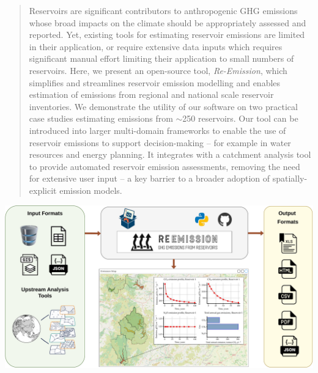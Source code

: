 \documentclass[final,1p,times]{elsarticle}
\begin{document}
\begin{frontmatter}
\begin{abstract}
Reservoirs are significant contributors to anthropogenic \ac{GHG} emissions whose broad impacts on the climate should be appropriately assessed and reported. 
Yet, existing tools for estimating reservoir emissions are limited in their application, or require extensive data inputs which requires significant manual effort limiting their application to small numbers of reservoirs.
Here, we present an open-source tool, \emph{Re-Emission}, which simplifies and streamlines reservoir emission modelling and enables estimation of emissions from regional and national scale reservoir inventories. 
We demonstrate the utility of our software on two practical case studies estimating emissions from $\sim$250 reservoirs.
Our tool can be introduced into larger multi-domain frameworks to enable the use of reservoir emissions to support decision-making -- for example in water resources and energy planning.
It integrates with a catchment analysis tool to provide automated reservoir emission assessments, removing the need for extensive user input -- a key barrier to a broader adoption of spatially-explicit emission models.
\end{abstract}

\begin{graphicalabstract}
\includegraphics[width=1\textwidth]{figures/graphical_abstract_new.drawio-compressed.pdf}
\end{graphicalabstract}


\end{frontmatter}
\end{document}
